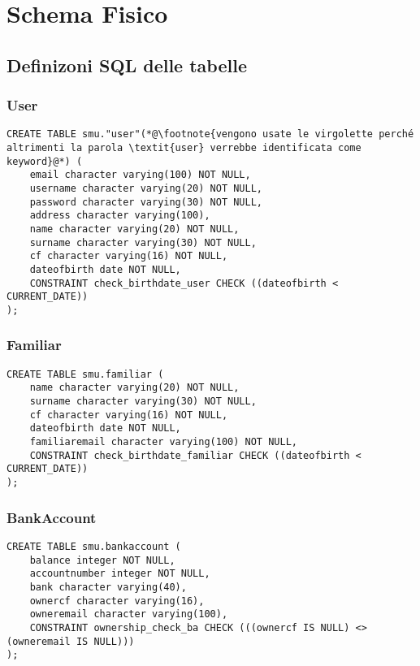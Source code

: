 \chapter{Schema Fisico}

\section{Definizoni SQL delle tabelle}

\subsection{User}

\begin{lstlisting}
CREATE TABLE smu."user"(*@\footnote{vengono usate le virgolette perché altrimenti la parola \textit{user} verrebbe identificata come keyword}@*) (
    email character varying(100) NOT NULL,
    username character varying(20) NOT NULL,
    password character varying(30) NOT NULL,
    address character varying(100),
    name character varying(20) NOT NULL,
    surname character varying(30) NOT NULL,
    cf character varying(16) NOT NULL,
    dateofbirth date NOT NULL,
    CONSTRAINT check_birthdate_user CHECK ((dateofbirth < CURRENT_DATE))
);
\end{lstlisting}

\subsection{Familiar}

\begin{lstlisting}
CREATE TABLE smu.familiar (
    name character varying(20) NOT NULL,
    surname character varying(30) NOT NULL,
    cf character varying(16) NOT NULL,
    dateofbirth date NOT NULL,
    familiaremail character varying(100) NOT NULL,
    CONSTRAINT check_birthdate_familiar CHECK ((dateofbirth < CURRENT_DATE))
);
\end{lstlisting}

\newpage

\subsection{BankAccount}

\begin{lstlisting}
CREATE TABLE smu.bankaccount (
    balance integer NOT NULL,
    accountnumber integer NOT NULL,
    bank character varying(40),
    ownercf character varying(16),
    owneremail character varying(100),
    CONSTRAINT ownership_check_ba CHECK (((ownercf IS NULL) <> (owneremail IS NULL)))
);
\end{lstlisting}


